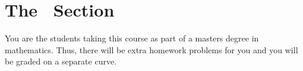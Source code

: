 \section*{The \sixhundredsection~Section}

You are the students taking this course as part of a masters degree in mathematics. Thus, there will be extra homework problems for you and you will be graded on a separate curve.